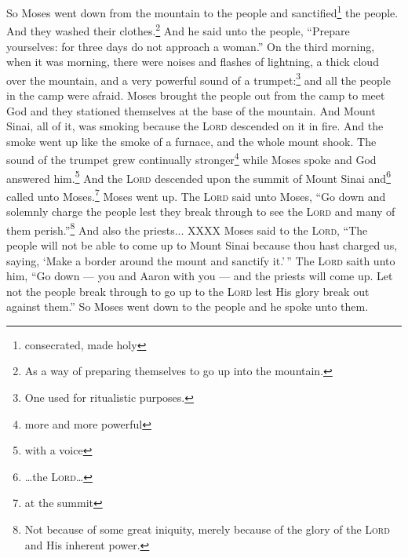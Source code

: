 \begin{enumerate}
     So Moses went down from the mountain to the people and sanctified\footnote{consecrated, made holy} the people. And they washed their clothes.\footnote{As a way of preparing themselves to go up into the mountain.}%
     And he said unto the people, ``Prepare yourselves: for three days do not approach a woman.''%
     On the third morning, when it was morning, there were noises and flashes of lightning, a thick cloud over the mountain, and a very powerful sound of a trumpet:\footnote{One used for ritualistic purposes.} and all the people in the camp were afraid.%
     Moses brought the people out from the camp to meet God and they stationed themselves at the base of the mountain.%
     And Mount Sinai, all of it, was smoking because the \textsc{Lord} descended on it in fire. And the smoke went up like the smoke of a furnace, and the whole mount shook.%
     The sound of the trumpet grew continually stronger\footnote{more and more powerful} while Moses spoke and God answered him.\footnote{with a voice}%
     And the \textsc{Lord} descended upon the summit of Mount Sinai and\footnote{\dots the \textsc{Lord}\dots} called unto Moses.\footnote{at the summit} Moses went up.%
     The \textsc{Lord} said unto Moses, ``Go down and solemnly charge the people lest they break through to see the \textsc{Lord} and many of them perish.''\footnote{Not because of some great iniquity, merely because of the glory of the \textsc{Lord} and His inherent power.}%
     And also the priests... XXXX%
     Moses said to the \textsc{Lord}, ``The people will not be able to come up to Mount Sinai because thou hast charged us, saying, `Make a border around the mount and sanctify it.'$\,$''%
     The \textsc{Lord} saith unto him, ``Go down — you and Aaron with you — and the priests will come up. Let not the people break through to go up to the \textsc{Lord} lest His glory break out against them.''%
     So Moses went down to the people and he spoke unto them.%
\end{enumerate}

